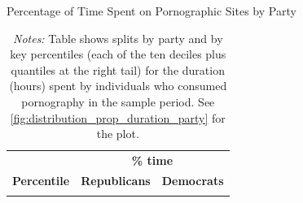 \documentclass[12pt, letterpaper]{article}
\begin{document}
\begin{table}[ht] \centering \small \setlength\tabcolsep{10 pt}
	\caption{Percentage of Time Spent on Pornographic Sites by Party}
	\label{tab:distribution_prop_duration_party}
	\begin{adjustbox}{max width=\textwidth}
		\begin{tabular}{crr}
			\toprule
			\multicolumn{1}{l}{\textbf{}}&\multicolumn{2}{c}{\textbf{\% time}}\\
			\cmidrule(l){2-3}
			\multicolumn{1}{l}{\textbf{Percentile}}&\multicolumn{1}{c}{\textbf{Republicans}}&\multicolumn{1}{c}{\textbf{Democrats}}\\
			\midrule
			\\
			\bottomrule
		\end{tabular}
	\end{adjustbox}
	\caption*{\footnotesize \emph{Notes:} 
		Table shows splits by party and by key percentiles (each of the ten deciles plus quantiles at the right tail) for the duration (hours) spent by individuals who consumed pornography in the sample period. See \cref{fig:distribution_prop_duration_party} for the plot.
	}
\end{table}
\end{document}
